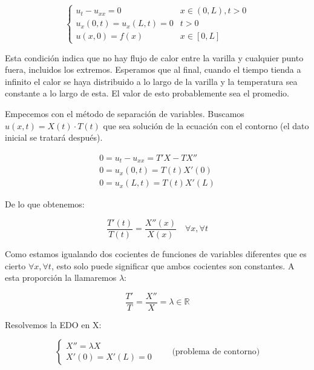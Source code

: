 	\begin{example} 

		\[
		\begin{cases}
		u_t - u_{xx} = 0 & x \in (0,L), t > 0 \\
		u_x(0,t) = u_x(L,t) = 0 & t > 0 \\
		u(x,0) = f(x) & x \in [0,L]
		\end{cases}
		\]

		Esta condición indica que no hay flujo de calor entre la varilla y cualquier punto fuera, incluidos los extremos. Esperamos que al final, cuando el tiempo tienda a infinito el calor se haya distribuido a lo largo de la varilla y la temperatura sea constante a lo largo de esta. El valor de esto probablemente sea el promedio.

		\begin{figure}[thbp]
		\centering
		\caption{}
		\label{fig:transmisionCalorNeumann}
		\end{figure}

		Empecemos con el método de separación de variables. Buscamos $u(x,t) = X(t) \cdot T(t)$ que sea solución de la ecuación con el contorno (el dato inicial se tratará después).


		\[
		\begin{array}{l}
			0 = u_t - u_{xx} = T' X - T X'' \\
			0 = u_x (0,t) = T(t) X'(0) \\
			0 = u_x (L,t) = T(t) X'(L)
		\end{array}
		\]

		De lo que obtenemos:

		\[ \frac{T'(t)}{T(t)} = \frac{X''(x)}{X(x)} \quad \forall x, \forall t \]

		Como estamos igualando dos cocientes de funciones de variables diferentes que es cierto $\forall x, \forall t$, esto solo puede significar que ambos cocientes son constantes. A esta proporción la llamaremos $\lambda$:

		\[ \frac{T'}{T} = \frac{X''}{X} = \lambda \in \mathbb{R} \]

		Resolvemos la EDO en X:

		\[
		\left\{ \begin{array}{l}
		X'' = \lambda X \\
		X'(0) = X'(L) = 0
		\end{array} \right. \quad\quad \text{(problema de contorno)}
		\]


\end{example}

